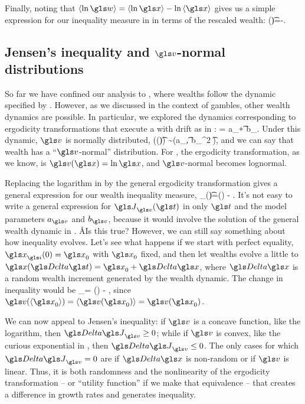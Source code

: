 Finally, noting that $\ave{\ln \gw}=\ave{\ln \x}-\ln\ave{\x}$ gives us a simple expression for our inequality measure in  in terms of the rescaled wealth:
\be
\J(\t)=-\ave{\ln \gw}.
\ee


\subsection{Jensen's inequality and $\gv$-normal distributions}
So far we have confined our analysis to \GBM, where wealths follow the dynamic specified by . However, as we discussed in the context of gambles, other wealth dynamics are possible. In particular, we explored the dynamics corresponding to ergodicity transformations that execute a \BM with drift as in :
\be
\gd\gv = a_\gv \gd\t + b_\gv \gd\gW.
\ee
Under this dynamic, $\gv$ is normally distributed,
\be
\gv(\x(\t)) \sim \mathcal{\N}\left(a_\gv\t, {b_\gv}^2 \t\right),
\ee
and we can say that wealth has a ``$\gv$-normal'' distribution. For \GBM, the ergodicity transformation, as we know, is $\gv(\x)=\ln \x$, and $\gv$-normal becomes lognormal.

Replacing the logarithm in  by the general ergodicity transformation gives a general expression for our wealth inequality measure,
\be
\J_\gv(\t)=\gv(\ave{\x(\t)}) - \ave{\gv(\x(\t))}.
\ee
It's not easy to write a general expression for $\J_\gv(\t)$ in only $\t$ and the model parameters $a_\gv$ and $b_\gv$, because it would involve the solution of the general wealth dynamic in . \AA{Is this true?} However, we can still say something about how inequality evolves. Let's see what happens if we start with perfect equality, $\x_\gi(0)=\x_0$ with $\x_0$ fixed, and then let wealths evolve a little to $\x(\D \t)=\x_0+\D \x$, where $\D \x$ is a random wealth increment generated by the wealth dynamic. The change in inequality would be
\be
\D \J_\gv = \gv() - ,
\ee
since $\gv(\ave{\x_0})=\ave{\gv(\x_0)}=\gv(\x_0)$.

We can now appeal to Jensen's inequality: if $\gv$ is a concave function, like the logarithm, then $\D \J_\gv \geq 0$; while if $\gv$ is convex, like the curious exponential in , then $\D \J_\gv \leq 0$. The only cases for which $\D \J_\gv=0$ are if $\D \x$ is non-random or if $\gv$ is linear. Thus, it is both randomness and the nonlinearity of the ergodicity transformation -- or ``utility function'' if we make that equivalence -- that creates a difference in growth rates and generates inequality.

